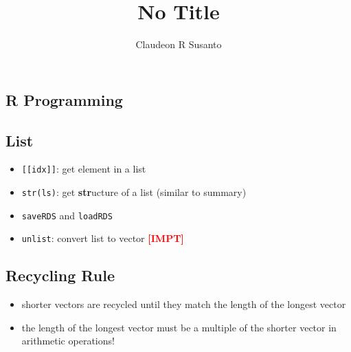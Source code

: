 \documentclass{article}
\title{No Title}
\author{Claudeon R Susanto}
\date{}
\newcommand{\impt}[0]{\textcolor{red}{\textbf{[IMPT] }}}
\begin{document}
{}\selectfont
\begin{multicols}{2}
\section{R Programming}
\subsection*{List}
\begin{itemize}
	\item \texttt{[[idx]]}: get element in a list
	\item \texttt{str(ls)}: get \textbf{str}ucture of a list (similar to summary)
	\item \texttt{saveRDS} and \texttt{loadRDS}
	\item \texttt{unlist}: convert list to vector \impt
\end{itemize}
\subsection*{Recycling Rule}
\begin{itemize}
	\item shorter vectors are recycled until they match the length of the longest vector
	\item the length of the longest vector must be a multiple of the shorter vector in arithmetic operations!
\end{itemize}

\end{multicols}
\end{document}
